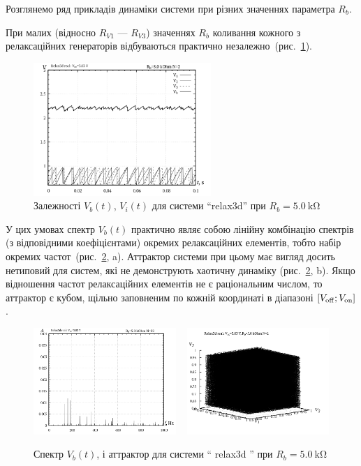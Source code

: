 Розглянемо ряд прикладів динаміки системи при різних значеннях
параметра $R_b$.

При малих (відносно $ R_{V1} $ --- $ R_{V3} $) значеннях
$ R_b $ коливання кожного з релаксаційних генераторів відбуваються
практично незалежно~(рис.~\ref{atu:f:relax3d_t_02}).

\begin{figure}[htb!]
  \centerline{\includegraphics[width=0.6\textwidth]{p/relax3d_t_02.png} }
  \caption{Залежності $V_b(t)$, $V_i(t)$ для системи ``relax3d'' при $R_b=\SI{5.0}{\kilo\ohm}$ }
  \label{atu:f:relax3d_t_02}
\end{figure}


У цих умовах спектр
$ V_b (t) $ практично являє собою лінійну комбінацію спектрів (з
відповідними коефіцієнтами) окремих релаксаційних елементів,
тобто набір окремих частот~(рис.~\ref{atu:f:relax3d_f_02}, a). Аттрактор
системи при цьому має вигляд досить нетиповий для систем, які
не демонструють хаотичну динаміку (рис.~\ref{atu:f:relax3d_f_02}, b). Якщо
відношення частот релаксаційних елементів не є раціональним
числом, то аттрактор є кубом, щільно заповненим по кожній
координаті в діапазоні
$ [V _\mathrm{off}; V _\mathrm{on}] $.


\begin{figure}[htb!]
  \centerline{
    \includegraphics[width=0.48\textwidth]{p/relax3d_f_02.png}
    ~
    \includegraphics[width=0.48\textwidth]{p/relax3d_v1v2v3_02.png}
  }
\caption{Спектр $ V_b (t) $, і аттрактор для системи `` relax3d '' при $ R_b = \SI{5.0}{\kilo \ohm} $}
\label{atu:f:relax3d_f_02}
\end{figure}

